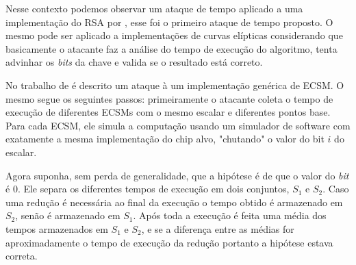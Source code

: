 Nesse contexto podemos observar um ataque de tempo aplicado a uma implementação do RSA por \cite{Kocher96}, esse foi o primeiro ataque de tempo proposto. O mesmo pode ser aplicado a implementações de curvas elípticas considerando que basicamente o atacante faz a análise do tempo de execução do algoritmo, tenta advinhar os \textit{bits} da chave e valida se o resultado está correto.

No trabalho de \cite{danger2013synthesis} é descrito um ataque à um implementação genérica de ECSM. O mesmo segue os seguintes passos: primeiramente o atacante coleta o tempo de execução de diferentes ECSMs com o mesmo escalar e diferentes pontos base. Para cada ECSM, ele simula a computação usando um simulador de software com exatamente a mesma implementação do chip alvo, "chutando" o valor do bit $i$ do escalar. 

Agora suponha, sem perda de generalidade, que a hipótese é de que o valor do \textit{bit} é $0$.  Ele separa os diferentes tempos de execução em dois conjuntos, $S_1$ e $S_2$. Caso uma redução é necessária ao final da execução o tempo obtido é armazenado em $S_2$, senão é armazenado em $S_1$. Após toda a execução é feita uma média dos tempos armazenados em $S_1$ e $S_2$, e se a diferença entre as médias for aproximadamente o tempo de execução da redução portanto a hipótese estava correta.

\begin{comment}
\erick[inline]{Lucas: ver o comentario no fonte. Converter comentario em texto}.

1.	Ataque SPA à alg. ECSM binário left-to-right (Dbl-and-Add not Always)
	a.	Se impl não é de tempo constante, então é possível realizar ataque de tempo.
		i.	P.ex., se usa if and else, então pode-se determinar a cada iteração qual bloco, if ou else, é tomado.
	b. O ataque de tempo em~\cite{Kocher96} ao RSA pode ser aplicado no contexto de ECC. Segue abaixo a ideia do ataque (baseada no survey de ~\cite{Danger2013}, Sec. 3.2.1).
	
	O atacante coleta o tempo de execução de diferentes ECSMs com o mesmo escalar e diferentes pontos base. Para cada ECSM, ele simula a computação usando um simulador de software com exatamente a mesma implementação do chip alvo, "chutando" o valor do bit $i$ do escalar. Suponha, sem perda de generalidade, que a hipótese é de que o valor do bit é 0.  Ele separa os diferentes tempos de execução em dois conjuntos, S_1 e S_2. Se, a iteração
	
	

[Kocher96] Kocher, P.C.: Timing attacks on implementations of Difﬁe–
Hellman, RSA, DSS, and other systems. In: Proceedings of CRYPTO’96, LNCS, vol. 1109. Springer, Berlin, pp. 104–113
(1996)
\end{comment}

